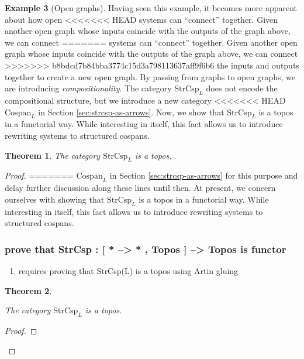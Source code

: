 \documentclass{amsart}
\newcommand{\Csp}{\cat{Cospan}}
\newcommand{\StrCsp}{\cat{StrCsp}}
\newcommand{\cat}[1]{\mathrm{#1}}
\newtheorem{theorem}{Theorem}[section]
\theoremstyle{remark}
\theoremstyle{definition}
\newtheorem{example}[theorem]{Example}
\begin{document}
\begin{example}[Open graphs]

Having seen this example, it becomes more apparent about how open
<<<<<<< HEAD
systems can ``connect'' together. Given another open graph whose
inputs coincide with the outputs of the graph above, we can connect
=======
systems can ``connect'' together. Given another open graph whose inputs
coincide with the outputs of the graph above, we can connect
>>>>>>> b8bdcd7b84bba3774c15d3a798113637aff9f6b6
the inputs and outputs together to create a new open graph. By passing
from graphs to open graphs, we are introducing
\emph{compositionality}. The category $ \StrCsp_{L} $ does not encode
the compositional structure, but we introduce a new category
<<<<<<< HEAD
$ \Csp_L $ in Section \ref{sec:strcsp-as-arrows}. Now, we show that
$ \StrCsp_L $ is a topos in a functorial way.  While interesting in
itself, this fact allows us to introduce rewriting systems to
structured cospans.

\begin{theorem}
\label{thm:strcsp-istopos}
  The category $ \StrCsp_L $ is a topos.
\end{theorem}

\begin{proof}
=======
$ \Csp_L $ in Section \ref{sec:strcsp-as-arrows} for this purpose
and delay further discussion along these lines until then. At present,
we concern ourselves with showing that $ \StrCsp_L $ is a topos in a
functorial way.  While interesting in itself, this fact allows us to
introduce rewriting systems to structured cospans.

\subsubsection{prove that StrCsp : [ * --> * , Topos ] --> Topos is functor}
\label{sec-2-2-4}
\begin{enumerate}
\item requires proving that StrCsp(L) is a topos using Artin gluing
\label{sec-2-2-4-1}
\end{enumerate}

\begin{theorem} \label{thm:strcsp-istopos}

  The category $ \StrCsp_L $ is a topos.
  
\end{theorem}

\begin{proof}


\end{proof}
\end{proof}
\end{example}
\end{document}

